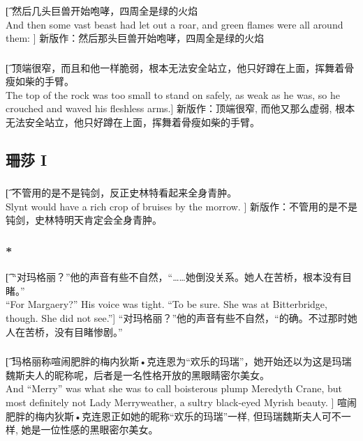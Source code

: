 \documentclass[12pt,a4paper]{article}
\begin{document}
\subsubsection{}\t[
	然后几头巨兽开始咆哮，四周全是绿的火焰\\
	And then some vast beast had let out a roar, and green flames were all around them: ]
	新版作：然后那头巨兽开始咆哮，四周全是绿的火焰
	
\subsubsection{}\t[
	顶端很窄，而且和他一样脆弱，根本无法安全站立，他只好蹲在上面，挥舞着骨瘦如柴的手臂。\\
	The top of the rock was too small to stand on safely, as weak as he was, so he crouched and waved his fleshless arms.] 
	新版作：顶端很窄, 而他又那么虚弱, 根本无法安全站立，他只好蹲在上面，挥舞着骨瘦如柴的手臂。
	
\subsection{珊莎 I}
\subsubsection{}\t[
	不管用的是不是钝剑，反正史林特看起来全身青肿。\\
	Slynt would have a rich crop of bruises by the morrow. ]
	新版作：不管用的是不是钝剑，史林特明天肯定会全身青肿。
	
\subsubsection{\color{red}*}\t[
	“对玛格丽？”他的声音有些不自然，“……她倒没关系。她人在苦桥，根本没有目睹。” \\
	“For Margaery?” His voice was tight. “To be sure. She was at Bitterbridge, though. She did not see.”]
	“对玛格丽？”他的声音有些不自然，“的确。不过那时她人在苦桥，没有目睹惨剧。”
	
\subsubsection{}\t[
	玛格丽称喧闹肥胖的梅内狄斯•克连恩为“欢乐的玛瑞”，她开始还以为这是玛瑞魏斯夫人的昵称呢，后者是一名性格开放的黑眼睛密尔美女。\\
	And “Merry” was what she was to call boisterous plump Meredyth Crane, but most definitely not Lady Merryweather, a sultry black-eyed Myrish beauty. ]
	喧闹肥胖的梅内狄斯•克连恩正如她的昵称“欢乐的玛瑞”一样, 但玛瑞魏斯夫人可不一样, 她是一位性感的黑眼密尔美女。
	
\end{document}
